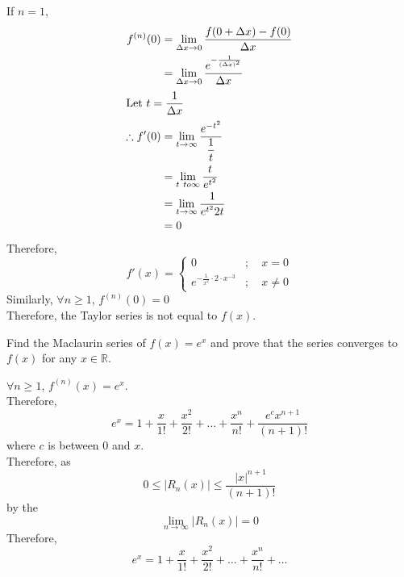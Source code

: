 \documentclass[fleqn, a4paper, 12pt, twoside]{article}
\theoremstyle{definition}
\theoremstyle{theorem}
\begin{document}
{\begin{solution}
	If $n = 1$,
	\begin{align*}
		f^{(n)}(0) &= \lim\limits_{\Delta x \to 0} \dfrac{f(0 + \Delta x) - f(0)}{\Delta x}\\
		&= \lim\limits_{\Delta x \to 0} \dfrac{e^{-\frac{1}{(\Delta x)^2}}}{\Delta x}\\
		\intertext{Let $t = \dfrac{1}{\Delta x}$}
		\therefore f'(0) &= \lim\limits_{t \to \infty} \dfrac{e^{-t^2}}{\dfrac{1}{t}}\\
		&= \lim\limits_{t\ to \infty} \dfrac{t}{e^{t^2}}\\
		&= \lim\limits_{t \to \infty} \dfrac{1}{e^{t^2} 2 t}\\
		&= 0
	\end{align*}
	Therefore,
	\begin{equation*}
		f'(x) = 
			\begin{cases}
				0 &;\quad x = 0\\
				e^{-\frac{1}{x^2} \cdot 2 \cdot x^{-3}} &;\quad x \neq 0
			\end{cases}
	\end{equation*}
	Similarly, $\forall n \ge 1$, $f^{(n)}(0) = 0$\\
	Therefore, the Taylor series is not equal to $f(x)$.
\end{solution}

\begin{question}
	Find the Maclaurin series of $f(x) = e^x$ and prove that the series converges to $f(x)$ for any $x \in \mathbb{R}$.
\end{question}

\begin{solution}
	$\forall n \ge 1$, $f^{(n)}(x) = e^x$.\\
	Therefore,
	\begin{equation*}
		e^x = 1 + \dfrac{x}{1!} + \dfrac{x^2}{2!} + \dots + \dfrac{x^n}{n!} + \dfrac{e^c x^{n + 1}}{(n + 1)!}
	\end{equation*}
	where $c$ is between $0$ and $x$.\\
	Therefore, as
	\begin{equation*}
		0 \le |R_n(x)| \le \dfrac{|x|^{n + 1}}{(n + 1)!}
	\end{equation*}
	by the  
	\begin{equation*}
		\lim\limits_{n \to \infty} |R_n (x)| = 0
	\end{equation*}
	Therefore,
	\begin{equation*}
		e^x = 1 + \dfrac{x}{1!} + \dfrac{x^2}{2!} + \dots + \dfrac{x^n}{n!} + \dots
	\end{equation*}
\end{solution}

}
\end{document}
